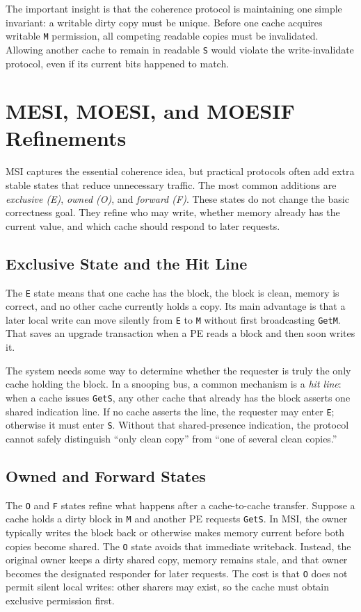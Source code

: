 The important insight is that the coherence protocol is maintaining one simple invariant: a writable dirty copy must be unique.
Before one cache acquires writable \texttt{M} permission, all competing readable copies must be invalidated.
Allowing another cache to remain in readable \texttt{S} would violate the write-invalidate protocol, even if its current bits happened to match.


\section{MESI, MOESI, and MOESIF Refinements}\label{sec:mp-mesi-moesi}
MSI captures the essential coherence idea, but practical protocols often add extra stable states that reduce unnecessary traffic.
The most common additions are \textit{exclusive (E)}, \textit{owned (O)}, and \textit{forward (F)}.
These states do not change the basic correctness goal.
They refine who may write, whether memory already has the current value, and which cache should respond to later requests.

\subsection*{Exclusive State and the Hit Line}
The \texttt{E} state means that one cache has the block, the block is clean, memory is correct, and no other cache currently holds a copy.
Its main advantage is that a later local write can move silently from \texttt{E} to \texttt{M} without first broadcasting \texttt{GetM}.
That saves an upgrade transaction when a PE reads a block and then soon writes it.

The system needs some way to determine whether the requester is truly the only cache holding the block.
In a snooping bus, a common mechanism is a \textit{hit line}: when a cache issues \texttt{GetS}, any other cache that already has the block asserts one shared indication line.
If no cache asserts the line, the requester may enter \texttt{E}; otherwise it must enter \texttt{S}.
Without that shared-presence indication, the protocol cannot safely distinguish ``only clean copy'' from ``one of several clean copies.''

\subsection*{Owned and Forward States}
The \texttt{O} and \texttt{F} states refine what happens after a cache-to-cache transfer.
Suppose a cache holds a dirty block in \texttt{M} and another PE requests \texttt{GetS}.
In MSI, the owner typically writes the block back or otherwise makes memory current before both copies become shared.
The \texttt{O} state avoids that immediate writeback.
Instead, the original owner keeps a dirty shared copy, memory remains stale, and that owner becomes the designated responder for later requests.
The cost is that \texttt{O} does not permit silent local writes: other sharers may exist, so the cache must obtain exclusive permission first.

